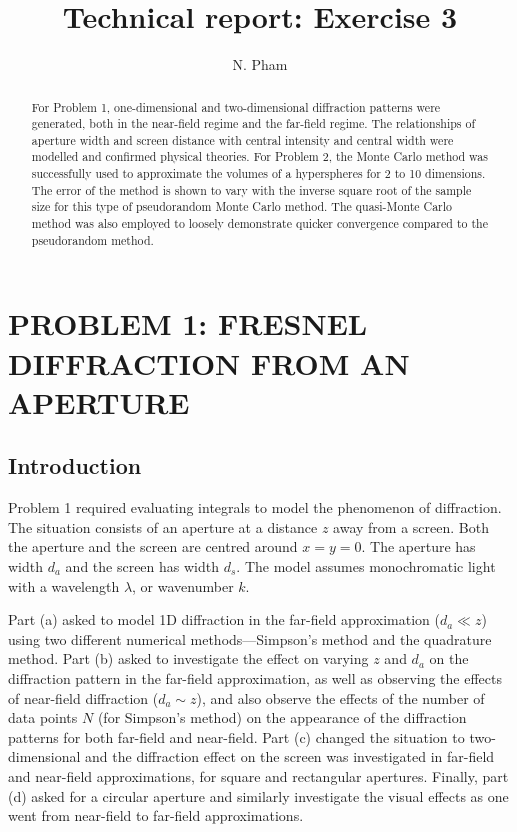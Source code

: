 \documentclass[hyphens,twocolumn,nobalancelastpage,aps,10pt,citeautoscript,longbibliography]{revtex4-2}
\begin{document}
\title{Technical report: Exercise 3}

\author{N. Pham}

\begin{abstract}
	For Problem 1, one-dimensional and two-dimensional diffraction patterns
	were generated, both in the near-field regime and the far-field regime. The
	relationships of aperture width and screen distance with central intensity and 
	central width were modelled and confirmed physical theories. For
	Problem 2, the Monte Carlo method was successfully used to approximate the
	volumes of a hyperspheres for 2 to 10 dimensions. The error of the method
	is shown to vary with the inverse square root of the sample size for this
	type of pseudorandom Monte Carlo method. The quasi-Monte Carlo method was
	also employed to loosely demonstrate quicker convergence compared to the
	pseudorandom method.
\end{abstract}

\maketitle

\section{PROBLEM 1: FRESNEL DIFFRACTION FROM AN APERTURE}%
\label{sec:problem_1}

\subsection{Introduction}%
\label{sub:introduction_1}

Problem 1 required evaluating integrals to model the phenomenon of diffraction.
The situation consists of an aperture at a distance $z$ away from a screen.
Both the aperture and the screen are centred around $x = y = 0$. The aperture
has width $d_a$ and the screen has width $d_s$. The model assumes monochromatic
light with a wavelength $\lambda$, or wavenumber $k$.

Part (a) asked to model 1D diffraction in the far-field approximation ($d_a \ll
	z$) using two different numerical methods---Simpson's method and the quadrature
method. Part (b) asked to investigate the effect on varying $z$ and $d_a$ on
the diffraction pattern in the far-field approximation, as well as observing
the effects of near-field diffraction ($d_a \sim z$), and also observe the
effects of the number of data points $N$ (for Simpson's method) on the
appearance of the diffraction patterns for both far-field and near-field. Part
(c) changed the situation to two-dimensional and the diffraction effect on the
screen was investigated in far-field and near-field approximations, for square
and rectangular apertures. Finally, part (d) asked for a circular aperture and
similarly investigate the visual effects as one went from near-field to
far-field approximations.
\end{document}

